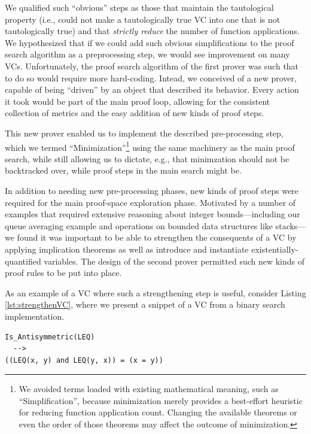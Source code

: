 We qualified such ``obvious'' steps as those that maintain the tautological property (i.e., could not make a tautologically true VC into one that is not tautologically true) and that \emph{strictly reduce} the number of function applications.  We hypothesized that if we could add such obvious simplifications to the proof search algorithm as a preprocessing step, we would see improvement on many VCs.  Unfortunately, the proof search algorithm of the first prover was such that to do so would require more hard-coding.  Intead, we conceived of a new prover, capable of being ``driven'' by an object that described its behavior.  Every action it took would be part of the main proof loop, allowing for the consistent collection of metrics and the easy addition of new kinds of proof steps.

This new prover enabled us to implement the described pre-processing step, which we termed ``Minimization''\footnote{We avoided terms loaded with existing mathematical meaning, such as ``Simplification'', because minimization merely provides a best-effort heuristic for reducing function application count.  Changing the available theorems or even the order of those theorems may affect the outcome of minimization.} using the same machinery as the main proof search, while still allowing us to dictate, e.g., that minimzation should not be backtracked over, while proof steps in the main search might be.

In addition to needing new pre-processing phases, new kinds of proof steps were required for the main proof-space exploration phase.  Motivated by a number of examples that required extensive reasoning about integer bounds---including our queue averaging example and operations on bounded data structures like stacks---we found it was important to be able to strengthen the consequents of a VC by applying implication theorems as well as introduce and instantiate existentially-quantified variables.  The design of the second prover permitted such new kinds of proof rules to be put into place.

As an example of a VC where such a strengthening step is useful, consider Listing \ref{lst:strengthenVC}, where we present a snippet of a VC from a binary search implementation.

\begin{lstlisting}[float=h,language=resolve,caption={A VC for which strenthening the consequent is useful\label{lst:strengthenVC}}]
Is_Antisymmetric(LEQ)
  -->
((LEQ(x, y) and LEQ(y, x)) = (x = y))
\end{lstlisting}

